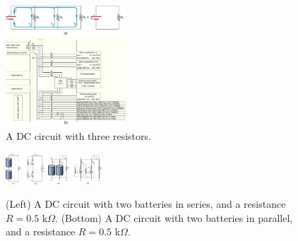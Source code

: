 \documentclass[12pt,twocolumn]{article}
\begin{document}
\begin{figure}
\centering
\includegraphics[width=0.4\textwidth,trim=0cm 13.5cm 5.5cm 0cm,clip=true]{parallel.jpeg}
\caption{\label{fig:para} \small A DC circuit with three resistors.}
\end{figure}
\begin{figure}
\centering
\includegraphics[width=0.13\textwidth,trim=0cm 0.5cm 4cm 0cm,clip=true]{series_batt.jpg}
\includegraphics[width=0.18\textwidth,trim=0cm 0.5cm 5.5cm 0.41cm,clip=true]{parallel_batt.jpg}
\caption{\label{fig:batt} \small (Left) A DC circuit with two batteries in series, and a resistance $R = 0.5$ k$\Omega$. (Bottom) A DC circuit with two batteries in parallel, and a resistance $R = 0.5$ k$\Omega$.}
\end{figure}
\end{document}
